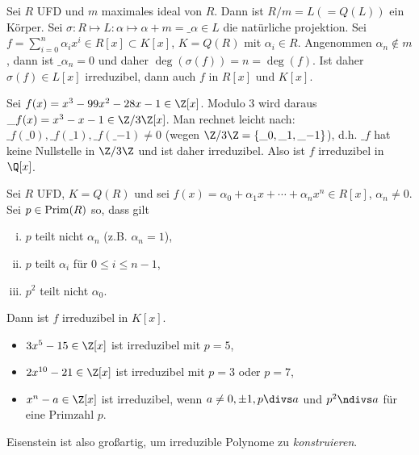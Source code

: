 \begin{ex} \label{15.3-13}
	Sei $R$ UFD und $m$ maximales ideal von $R$.
	Dann ist $R / m = L (= Q(L))$ ein Körper.
	Sei $\sigma: R \mapsto L: \alpha \mapsto \alpha + m = \_\alpha \in L$ die natürliche projektion.
	Sei $f = \sum_{i=0}^n \alpha_i x^i \in R[x] \subset K[x]$, $K = Q(R)$ mit $\alpha_i \in R$.
	Angenommen $\alpha_n \not\in m$, dann ist $\_{\alpha_n} = 0$ und daher $\deg(\sigma(f)) = n = \deg(f)$.
	Ist daher $\sigma(f) \in L[x]$ irreduzibel, dann auch $f$ in $R[x]$ und $K[x]$.
	\begin{ex*}
		Sei $f(x) = x^3 - 99x^2 - 28x - 1 \in \Z[x]$.
		Modulo 3 wird daraus $\_f(x) = x^3 - x - 1 \in \Z / 3\Z[x]$.
		Man rechnet leicht nach: $\_f(\_0), \_f(\_1), \_f(\_{-1}) \neq 0$ (wegen $\Z / 3\Z = \{\_0, \_1, \_{-1}\}$), d.h. $\_f$ hat keine Nullstelle in $\Z / 3\Z$ und ist daher irreduzibel.
		Also ist $f$ irreduzibel in $\Q[x]$.
	\end{ex*}
\end{ex}

\begin{st} \label{15.3-14}
	Sei $R$ UFD, $K = Q(R)$ und sei $f(x) = \alpha_0 + \alpha_1 x + \dotsb + \alpha_n x^n \in R[x]$, $\alpha_n \neq 0$.
	Sei $p \in \operatorname{Prim}(R)$ so, dass gilt
	\begin{enumerate}[i)]
		\item
			$p$ teilt nicht $\alpha_n$ (z.B. $\alpha_n = 1$),
		\item
			$p$ teilt $\alpha_i$ für $0 \le i \le n - 1$,
		\item
			$p^2$ teilt nicht $\alpha_0$.
	\end{enumerate}
	Dann ist $f$ irreduzibel in $K[x]$.
\end{st}

\begin{ex} \label{15.3-15}
	\begin{itemize}
		\item
			$3x^5 - 15 \in \Z[x]$ ist irreduzibel mit $p = 5$,
		\item
			$2x^{10} - 21 \in \Z[x]$ ist irreduzibel mit $p = 3$ oder $p = 7$,
		\item
			$x^n - a \in \Z[x]$ ist irreduzibel, wenn $a \neq 0, \pm 1, p\divs a$ und $p^2 \ndivs a$ für eine Primzahl $p$.
	\end{itemize}
	Eisenstein ist also großartig, um irreduzible Polynome zu \emph{konstruieren}.
\end{ex}

